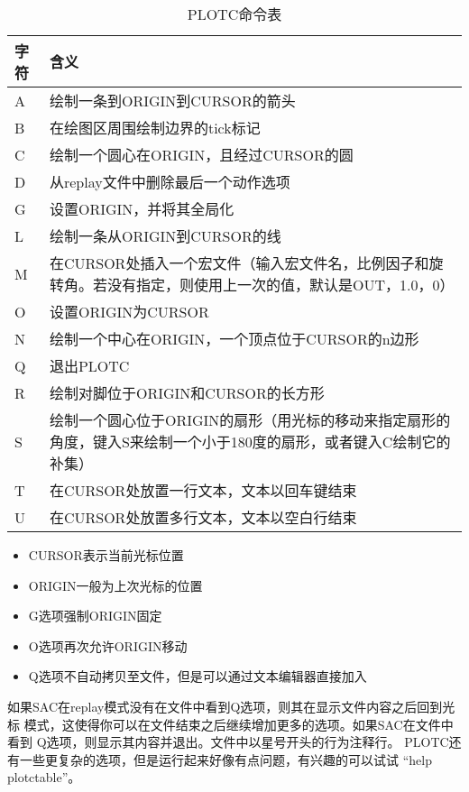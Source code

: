 \begin{table}[h]
\caption{PLOTC命令表}
\centering
\begin{tabular}{p{1cm}p{14cm}}
	\toprule
	字符	& 	含义	\\
	\midrule
	A		&	绘制一条到ORIGIN到CURSOR的箭头	\\
	B		&	在绘图区周围绘制边界的tick标记  \\
	C		&	绘制一个圆心在ORIGIN，且经过CURSOR的圆	\\
	D		&	从replay文件中删除最后一个动作选项	\\
	G		&	设置ORIGIN，并将其全局化	\\
	L		& 	绘制一条从ORIGIN到CURSOR的线	\\
	M		&	在CURSOR处插入一个宏文件（输入宏文件名，比例因子和旋转角。若没有指定，则使用上一次的值，默认是OUT，1.0，0）\\
	O		&	设置ORIGIN为CURSOR		\\
	N		&	绘制一个中心在ORIGIN，一个顶点位于CURSOR的n边形 \\
	Q		&	退出PLOTC	\\
	R		&	绘制对脚位于ORIGIN和CURSOR的长方形	\\
	S		&	绘制一个圆心位于ORIGIN的扇形（用光标的移动来指定扇形的角度，键入S来绘制一个小于180度的扇形，或者键入C绘制它的补集）\\
	T		&	在CURSOR处放置一行文本，文本以回车键结束	\\
	U		&	在CURSOR处放置多行文本，文本以空白行结束	\\
	\bottomrule
\end{tabular}
\end{table}
\begin{itemize}
\item CURSOR表示当前光标位置
\item ORIGIN一般为上次光标的位置
\item G选项强制ORIGIN固定
\item O选项再次允许ORIGIN移动
\item Q选项不自动拷贝至文件，但是可以通过文本编辑器直接加入
\end{itemize}
如果SAC在replay模式没有在文件中看到Q选项，则其在显示文件内容之后回到光标
模式，这使得你可以在文件结束之后继续增加更多的选项。如果SAC在文件中看到
Q选项，则显示其内容并退出。文件中以星号开头的行为注释行。
PLOTC还有一些更复杂的选项，但是运行起来好像有点问题，有兴趣的可以试试
``help plotctable''。


	
	

